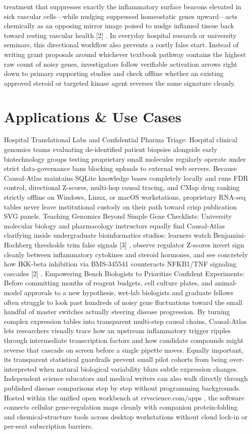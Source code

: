 \documentclass[10pt,letterpaper]{article}
\begin{document}
treatment that suppresses exactly the inflammatory surface beacons elevated in sick vascular cells---while nudging suppressed homeostatic genes upward---acts chemically as an opposing mirror image poised to nudge inflamed tissue back toward resting vascular health [2] . In everyday hospital research or university seminars, this directional workflow also prevents a costly false start. Instead of writing grant proposals around whichever textbook pathway contains the highest raw count of noisy genes, investigators follow verifiable activation arrows right down to primary supporting studies and check offline whether an existing approved steroid or targeted kinase agent reverses the same signature cleanly.

\section{Applications \& Use Cases}
Hospital Translational Labs and Confidential Pharma Triage: Hospital clinical genomics teams evaluating de-identified patient biopsies alongside early biotechnology groups testing proprietary small molecules regularly operate under strict data-governance bans blocking uploads to external web servers. Because Causal-Atlas maintains SQLite knowledge bases completely locally and runs FDR control, directional Z-scores, multi-hop causal tracing, and CMap drug ranking strictly offline on Windows, Linux, or macOS workstations, proprietary RNA-seq tables never leave institutional custody on their path toward crisp publication SVG panels. Teaching Genomics Beyond Simple Gene Checklists: University molecular biology and pharmacology instructors equally find Causal-Atlas clarifying inside undergraduate bioinformatics studios: learners watch Benjamini-Hochberg thresholds trim false signals [3] , observe regulator Z-scores invert sign cleanly between inflammatory cytokines and steroid hormones, and see concretely how IKK-beta inhibition via BMS-345541 counteracts NFKB1/TNF signaling cascades [2] . Empowering Bench Biologists to Prioritize Confident Experiments: Before committing months of reagent budgets, cell culture plates, and animal-model approvals to a new hypothesis, wet-lab biologists and graduate fellows often struggle to look past hundreds of noisy gene fluctuations toward the small handful of master switches actually steering disease progression. By turning complex expression tables into transparent multi-step causal chains, Causal-Atlas lets researchers visually trace how an upstream inflammatory trigger ripples through intermediate transcription factors and how candidate compounds might reverse that cascade on screen before a single pipette moves. Equally important, its transparent statistical guardrails prevent small pilot cohorts from being over-interpreted when natural biological variability blurs subtle expression changes. Independent science educators and medical writers can also walk directly through published disease comparisons step by step without programming backgrounds. Hosted within the unified open workbench at crvscience.com/apps , the software connects cellular gene-regulation maps cleanly with companion protein-folding and chemical-structure tools across desktop workstations without cloud lock-in or per-seat subscription barriers.
\end{document}
